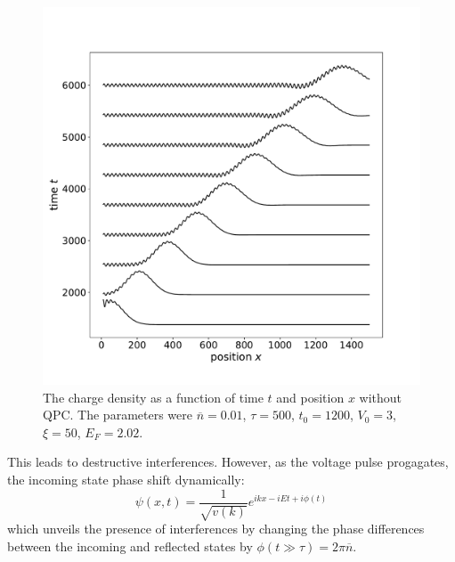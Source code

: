 \documentclass[aps,prl,preprint,groupedaddress]{revtex4-1}
\begin{document}
\begin{figure}
	\centering
	\includegraphics[width=0.7\linewidth]{../figures/density_on_202}
	\caption{The charge density as a function of time $t$ and position $x$ without QPC. The parameters were $\overline{n} =0.01$, $\tau = 500$, $t_0 =1200$, $V_0 = 3$, $\xi = 50$, $E_F =2.02$.}
	\label{fig:densityon202}
\end{figure}




This leads to destructive interferences. However, as the voltage pulse progagates, the incoming state phase shift dynamically:
\begin{equation}
\psi(x,t) =  \frac{1}{\sqrt{v(k)}} e^{ikx - iEt + i\phi(t)}
\end{equation}
which unveils the presence of interferences by changing the phase differences between the incoming and reflected states by $\phi(t\gg \tau) = 2\pi \overline{n}$.


\end{document}
